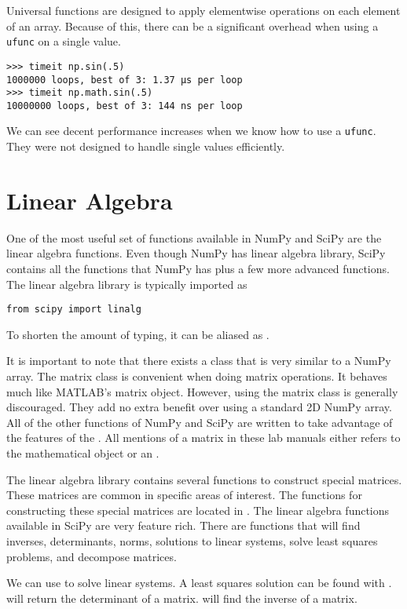 Universal functions are designed to apply elementwise operations on each element of an array.
Because of this, there can be a significant overhead when using a \texttt{ufunc} on a single value.
\begin{lstlisting}
>>> timeit np.sin(.5)
1000000 loops, best of 3: 1.37 µs per loop
>>> timeit np.math.sin(.5)
10000000 loops, best of 3: 144 ns per loop
\end{lstlisting}
We can see decent performance increases when we know how to use a \texttt{ufunc}.
They were not designed to handle single values efficiently.

\section*{Linear Algebra}
One of the most useful set of functions available in NumPy and SciPy are the linear algebra functions.
Even though NumPy has linear algebra library, SciPy contains all the functions that NumPy has plus a few more advanced functions.
The linear algebra library is typically imported as
\begin{lstlisting}
from scipy import linalg
\end{lstlisting}
To shorten the amount of typing, it can be aliased as .

It is important to note that there exists a  class that is very similar to a NumPy array.  
The matrix class is convenient when doing matrix operations. 
It behaves much like MATLAB's matrix object.
However, using the matrix class is generally discouraged.  They add no extra benefit over using a standard 2D NumPy array.
All of the other functions of NumPy and SciPy are written to take advantage of the features of the .  
All mentions of a matrix in these lab manuals either refers to the mathematical object or an .

The linear algebra library contains several functions to construct special matrices.
These matrices are common in specific areas of interest.  
The functions for constructing these special matrices are located in .
The linear algebra functions available in SciPy are very feature rich.
There are functions that will find inverses, determinants, norms, solutions to linear systems, solve least squares problems, and decompose matrices.

We can use  to solve linear systems.  A least squares solution can be found with .
 will return the determinant of a matrix.  will find the inverse of a matrix.


